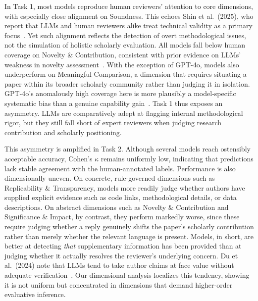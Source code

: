 \documentclass[preprint,10pt,times]{elsarticle}
\begin{document}
In Task 1, most models reproduce human reviewers' attention to core dimensions, with especially close alignment on Soundness. This echoes Shin et al.\ (2025), who report that LLMs and human reviewers alike treat technical validity as a primary focus~\cite{ref26}. Yet such alignment reflects the detection of overt methodological issues, not the simulation of holistic scholarly evaluation. All models fall below human coverage on Novelty \& Contribution, consistent with prior evidence on LLMs' weakness in novelty assessment~\cite{ref41,ref42}. With the exception of GPT-4o, models also underperform on Meaningful Comparison, a dimension that requires situating a paper within its broader scholarly community rather than judging it in isolation. GPT-4o's anomalously high coverage here is more plausibly a model-specific systematic bias than a genuine capability gain~\cite{ref43}. Task 1 thus exposes an asymmetry. LLMs are comparatively adept at flagging internal methodological rigor, but they still fall short of expert reviewers when judging research contribution and scholarly positioning.

This asymmetry is amplified in Task 2. Although several models reach ostensibly acceptable accuracy, Cohen's $\kappa$ remains uniformly low, indicating that predictions lack stable agreement with the human-annotated labels. Performance is also dimensionally uneven. On concrete, rule-governed dimensions such as Replicability \& Transparency, models more readily judge whether authors have supplied explicit evidence such as code links, methodological details, or data descriptions. On abstract dimensions such as Novelty \& Contribution and Significance \& Impact, by contrast, they perform markedly worse, since these require judging whether a reply genuinely shifts the paper's scholarly contribution rather than merely whether the relevant language is present. Models, in short, are better at detecting \emph{that} supplementary information has been provided than at judging whether it actually resolves the reviewer's underlying concern. Du et al.\ (2024) note that LLMs tend to take author claims at face value without adequate verification~\cite{ref44}. Our dimensional analysis localizes this tendency, showing it is not uniform but concentrated in dimensions that demand higher-order evaluative inference.
\end{document}
